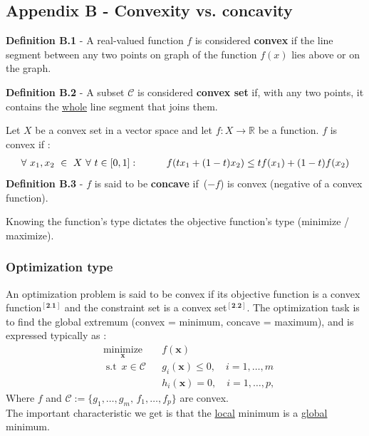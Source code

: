 \documentclass[12pt]{article}
\newcommand\tab[1][1cm]{\hspace*{#1}}
\numberwithin{equation}{section}
\begin{document}
\begin{flushleft}
\subsection*{\hypertarget{app_convex}{Appendix B} - Convexity vs. concavity}   

\textbf{Definition B.1} - A real-valued function $f$ is considered \textbf{convex} if the line segment between any two points on graph of the function $f(x)$ lies above or on the graph. 

\textbf{Definition B.2} - A subset $\mathcal{C}$ is considered \textbf{convex set} if, with any two points, it contains the \underline{whole} line segment that joins them.

Let $X$ be a convex set in a vector space and let $f:X \rightarrow \mathbb{R}$ be a function. $f$ is convex if :
\begin{align*}
\forall \ x_1, x_2 \ \in \ X \ \forall \ t \in [0, 1] : \tab 
f( t x_1 + (1-t)x_2) \leq tf(x_1) + (1-t)f(x_2)
\end{align*}
\textbf{\hypertarget{convex_concave}{Definition B.3}} - $f$ is said to be \textbf{concave} if \,($-f$) is convex (negative of a convex function).

Knowing the function's type dictates the objective function's type (minimize / maximize).


\subsubsection*{Optimization type}

An optimization problem is said to be convex if its objective function is a convex function$^{[\textbf{2.1}]}$ and the constraint set is a convex set$^{[\textbf{2.2}]}$. The optimization task is to find the global extremum (convex = minimum, concave = maximum), and is expressed typically as :
\begin{align*}
&\underset{\mathbf{x}}{\operatorname{minimize}}& & f(\mathbf{x}) \\
&\operatorname{s.t} \ x \in \mathcal{C}
& &g_i(\mathbf{x}) \leq 0, \quad i = 1, \dots, m \\
&&&h_i(\mathbf{x}) = 0, \quad i = 1, \dots, p,
\end{align*}
Where $f$ and $\mathcal{C} := \{ g_1, \hdots, g_m, \, f_1, \hdots, f_p \}$ are convex. \\
The important characteristic we get is that the \underline{local} minimum is a \underline{global} minimum.


\end{flushleft}
\end{document}

